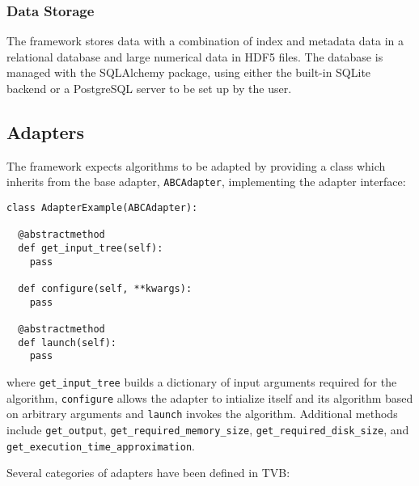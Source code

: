 \subsubsection{Data Storage}


The framework stores data with a combination of index and metadata data in a relational
database and large numerical data in HDF5 files. The database is managed 
with the SQLAlchemy package, using either the built-in SQLite backend or 
a PostgreSQL server to be set up by the user. 

\subsection{Adapters}

The framework expects algorithms to be adapted by providing a class
which inherits from the base adapter, \texttt{ABCAdapter}, implementing 
the adapter interface:

\begin{lstlisting}[caption={The ABCAdapter listing},
                   label={lst:ABCAdapter}]
class AdapterExample(ABCAdapter):

  @abstractmethod
  def get_input_tree(self):
  	pass

  def configure(self, **kwargs):
  	pass

  @abstractmethod
  def launch(self):
  	pass
\end{lstlisting}

\noindent where \texttt{get\_input\_tree} builds a dictionary of input
arguments required for the algorithm, \texttt{configure} allows the 
adapter to intialize itself and its algorithm based on arbitrary arguments
and \texttt{launch} invokes the algorithm.
Additional methods include \texttt{get\_output}, \texttt{get\_required\_memory\_size},
\texttt{get\_required\_disk\_size}, and \texttt{get\_execution\_time\_approximation}.

Several categories of adapters have been defined in TVB: 

